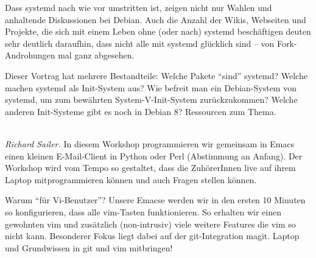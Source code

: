 \documentclass[10pt,a4paper,ngerman]{scrartcl}
\let\origdescription\description
\renewenvironment{description}{
  \setlength{\leftmargini}{0em}
  \origdescription
  \setlength{\itemindent}{0em}
  \setlength{\itemsep}{1.2em}
  \setlength{\labelsep}{\textwidth}
}
{\endlist}
\newcommand{\vorschub}{\mbox{}\\[-0.5em]}
\begin{document}
\begin{multicols}{2}
\begin{description}
Dass systemd nach wie vor umstritten ist, zeigen nicht nur Wahlen und anhaltende Diskussionen bei Debian. Auch die Anzahl der Wikis, Webseiten und Projekte, die sich mit einem Leben ohne (oder nach) systemd beschäftigen deuten sehr deutlich daraufhin, dass nicht alle mit systemd glücklich sind – von Fork-Androhungen mal ganz abgesehen.

Dieser Vortrag hat mehrere Bestandteile: Welche Pakete "`sind"' systemd? Welche machen systemd als Init-System aus? Wie befreit man ein Debian-System von systemd, um zum bewährten System-V-Init-System zurückzukommen? Welche anderen Init-Systeme gibt es noch in Debian 8? Ressourcen zum Thema.

\end{description}

\end{multicols}

\vfill
\begin{center}\parbox{0.6\textwidth}{%
\begin{description}
\item[Workshop von 10:45 Uhr bis 12:30 Uhr: Git und Emacs für Vi-Benutzer]\vorschub
\textsl{Richard Sailer.}
In diesem Workshop programmieren wir gemeinsam in Emacs einen kleinen E-Mail-Client in Python oder Perl (Abstimmung an Anfang). Der Workshop wird vom Tempo so gestaltet, dass die ZuhörerInnen live auf ihrem Laptop mitprogrammieren können und auch Fragen stellen können.

Warum "`für Vi-Benutzer"'? Unsere Emacse werden wir in den ersten 10 Minuten so konfigurieren, dass alle vim-Tasten funktionieren. So erhalten wir einen gewohnten vim und zusätzlich (non-intrusiv) viele weitere Features die vim so nicht kann.
Besonderer Fokus liegt dabei auf der git-Integration magit. Laptop und Grundwissen in git und vim mitbringen!
\end{description}
}\end{center}

\newpage
\end{document}
